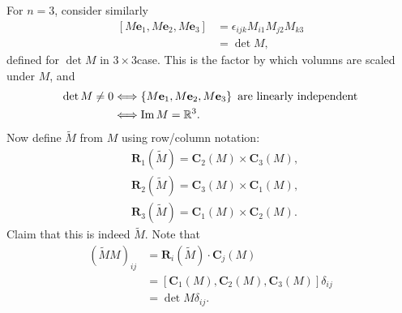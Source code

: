 \documentclass[a4paper]{article}
\begin{document}
    For $n=3$, consider similarly
    \[
      \begin{aligned}
        [M\mathbf{e}_1, M\mathbf{e}_2, M\mathbf{e}_3]&=
        \epsilon_{ijk}M_{i1}M_{j2}M_{k3}\\
        &= \det M,
      \end{aligned}
    \]
    defined for $ \det M $ in $ 3 \times 3 $case. This is the factor
    by which volumns are scaled under $M$, and
    \[
      \begin{aligned}
        \det M\neq 0 &\Longleftrightarrow \left\{ M \mathbf{e}_1,
        M\mathbf{e}_2,M\mathbf{e}_3\right\} \text{ are linearly independent}\\
        & \Longleftrightarrow \operatorname{Im} M=\mathbb{R}^{3}.
      \end{aligned}
    \]
    Now define $ \tilde{M} $ from $M$ using row/column notation:
    \[
      \begin{aligned}
        &\mathbf{R}_1(\tilde{M})=\mathbf{C}_2(M)\times \mathbf{C}_3(M),
        \\
        &\mathbf{R}_2(\tilde{M})=\mathbf{C}_3(M)\times \mathbf{C}_1(M),
        \\
        &\mathbf{R}_3(\tilde{M})=\mathbf{C}_1(M)\times \mathbf{C}_2(M).
      \end{aligned}
    \]
    Claim that this is indeed $ \tilde{M} $. Note that
    \[
      \begin{aligned}
        (\tilde{M}M)_{ij}&=\mathbf{R}_i(\tilde{M}) \cdot \mathbf{C}_j(M)\\
        &=[\mathbf{C}_1(M),\mathbf{C}_2(M),\mathbf{C}_3(M)]\delta_{ij}\\
        &=\det M \delta_{ij}.
      \end{aligned}
    \]
\end{document}
